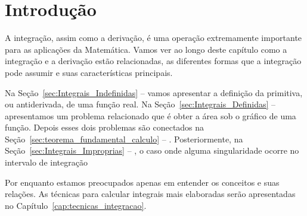 \section{Introdução}
\label{sec:introducao_integracao}

A integração, assim como a derivação, é uma operação extremamente 
importante para as aplicações da Matemática. Vamos ver ao longo deste 
capítulo como a integração e a derivação estão relacionadas, 
as diferentes formas que a integração pode assumir
e suas características principais.

Na Seção~\ref{sec:Integrais_Indefinidas} --  
vamos apresentar a definição da primitiva, ou antiderivada, de uma função real. 
Na Seção~\ref{sec:Integrais_Definidas} --  
apresentamos um problema relacionado que é obter a área sob o gráfico de uma função. 
Depois esses dois problemas são conectados na 
Seção~\ref{sec:teorema_fundamental_calculo} -- .
Posteriormente, na Seção~\ref{sec:Integrais_Improprias} -- ,
o caso onde alguma singularidade ocorre no intervalo de integração

Por enquanto estamos preocupados apenas em entender os conceitos e suas relações. 
As técnicas para calcular integrais mais elaboradas serão apresentadas no 
Capítulo~\ref{cap:tecnicas_integracao}.